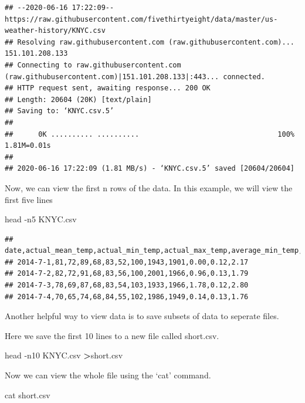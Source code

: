 \documentclass[]{book}
\newenvironment{Shaded}{\begin{snugshade}}{\end{snugshade}}
\newcommand{\FunctionTok}[1]{\textcolor[rgb]{0.00,0.00,0.00}{#1}}
\newcommand{\OperatorTok}[1]{\textcolor[rgb]{0.81,0.36,0.00}{\textbf{#1}}}
\newcommand{\NormalTok}[1]{#1}
\begin{document}
\begin{verbatim}
## --2020-06-16 17:22:09--  https://raw.githubusercontent.com/fivethirtyeight/data/master/us-weather-history/KNYC.csv
## Resolving raw.githubusercontent.com (raw.githubusercontent.com)... 151.101.208.133
## Connecting to raw.githubusercontent.com (raw.githubusercontent.com)|151.101.208.133|:443... connected.
## HTTP request sent, awaiting response... 200 OK
## Length: 20604 (20K) [text/plain]
## Saving to: ‘KNYC.csv.5’
## 
##      0K .......... ..........                                 100% 1.81M=0.01s
## 
## 2020-06-16 17:22:09 (1.81 MB/s) - ‘KNYC.csv.5’ saved [20604/20604]
\end{verbatim}

Now, we can view the first n rows of the data. In this example, we will
view the first five lines

\begin{Shaded}
\begin{Highlighting}[]
\FunctionTok{head}\NormalTok{ -n5 KNYC.csv}
\end{Highlighting}
\end{Shaded}

\begin{verbatim}
## date,actual_mean_temp,actual_min_temp,actual_max_temp,average_min_temp,average_max_temp,record_min_temp,record_max_temp,record_min_temp_year,record_max_temp_year,actual_precipitation,average_precipitation,record_precipitation
## 2014-7-1,81,72,89,68,83,52,100,1943,1901,0.00,0.12,2.17
## 2014-7-2,82,72,91,68,83,56,100,2001,1966,0.96,0.13,1.79
## 2014-7-3,78,69,87,68,83,54,103,1933,1966,1.78,0.12,2.80
## 2014-7-4,70,65,74,68,84,55,102,1986,1949,0.14,0.13,1.76
\end{verbatim}

Another helpful way to view data is to save subsets of data to seperate
files.

Here we save the first 10 lines to a new file called short.csv.

\begin{Shaded}
\begin{Highlighting}[]
\FunctionTok{head}\NormalTok{ -n10 KNYC.csv }\OperatorTok{>}\NormalTok{short.csv}
\end{Highlighting}
\end{Shaded}

Now we can view the whole file using the `cat' command.

\begin{Shaded}
\begin{Highlighting}[]
\FunctionTok{cat}\NormalTok{ short.csv}
\end{Highlighting}
\end{Shaded}
\end{document}
